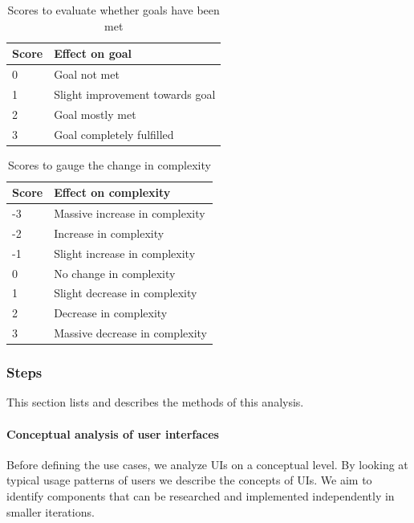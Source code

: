 \begin{table}
  \begin{center}
    \begin{tabular}{|l|l|}
      \hline
      \textbf{Score} & \textbf{Effect on goal} \\
      \hline
      0 & Goal not met \\
      \hline
      1 & Slight improvement towards goal \\
      \hline
      2 & Goal mostly met \\
      \hline
      3 & Goal completely fulfilled \\
      \hline
    \end{tabular}
    \caption{Scores to evaluate whether goals have been met}
  \end{center}
\end{table}

\begin{table}
  \begin{center}
    \begin{tabular}{|l|l|}
      \hline
      \textbf{Score} & \textbf{Effect on complexity} \\
      \hline
      -3 & Massive increase in complexity \\
      \hline
      -2 & Increase in complexity \\
      \hline
      -1 & Slight increase in complexity \\
      \hline
      0 & No change in complexity \\
      \hline
      1 & Slight decrease in complexity \\
      \hline
      2 & Decrease in complexity \\
      \hline
      3 & Massive decrease in complexity \\
      \hline
    \end{tabular}
    \caption{Scores to gauge the change in complexity}
  \end{center}
\end{table}

\subsubsection{Steps}
This section lists and describes the methods of this analysis.

\paragraph{Conceptual analysis of user interfaces}
Before defining the use cases, we analyze UIs on a conceptual level. By looking at typical usage patterns of users we describe the concepts of UIs. We aim to identify components that can be researched and implemented independently in smaller iterations.

